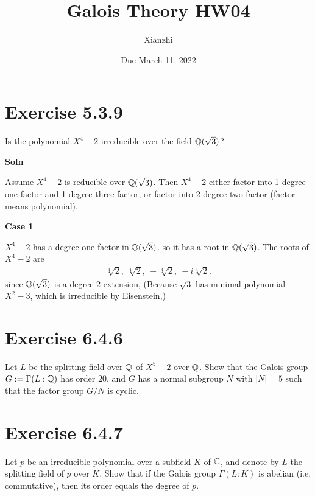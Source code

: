 \documentclass[12pt,english]{article}
\title{Galois Theory HW04}
\author{Xianzhi}
\date{Due March 11, 2022}
\begin{document}
\maketitle

\section*{Exercise 5.3.9}
\begin{question}
    Is the polynomial $X^4 -2$ irreducible over the field $\mathbb{Q}(\sqrt{3})$?
\end{question}

\textbf{Soln}

Assume $X^4 - 2$ is reducible over $\mathbb{Q}(\sqrt{3})$.
Then $X^4 -2$ either factor into 1 degree one factor and 1 degree three factor, or 
factor into 2 degree two factor (factor means polynomial).

\textbf{Case 1}

$X^4 -2$ has a degree one factor in $\mathbb{Q}(\sqrt{3})$. 
so it has a root in $\mathbb{Q}(\sqrt{3})$. The roots of $X^4 - 2$ are
\begin{align}
    \sqrt[4]{2}, \ \sqrt[4]{2}, \ - \sqrt[4]{2}, \ - i \sqrt[4]{2}. 
\end{align}
since $\mathbb{Q} (\sqrt{3})$ is a degree $2$ extension, 
(Because $\sqrt{3}$ has minimal polynomial $X^2 -3$, which is irreducible by Eisenstein,)




\section*{Exercise 6.4.6}
\begin{question}
    Let $L$ be the splitting field over $\mathbb{Q}$ of $X^5 - 2$ over $\mathbb{Q}$. 
    Show that the Galois group $G:=\Gamma(L:\mathbb{Q})$ has order $20$,
    and $G$ has a normal subgroup $N$ with $\lvert N \rvert = 5$
    such that the factor group $G/N$ is cyclic.
\end{question}

\section*{Exercise 6.4.7}
\begin{question}
    Let $p$ be an irreducible polynomial over a subfield $K$ of $\mathbb{C}$, and denote by $L$ the splitting field of $p$ over $K$. 
    Show that if the Galois group $\Gamma (L:K)$ is abelian (i.e. commutative), 
    then its order equals the degree of $p$.
\end{question}
\end{document}
